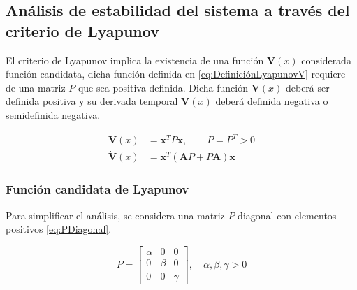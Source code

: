 
\subsection{Análisis de estabilidad del sistema a través del criterio de Lyapunov}

El criterio de Lyapunov implica la existencia de una función $\mathbf{V}(x)$ considerada
función candidata, dicha función definida en \eqref{eq:DefiniciónLyapunovV} requiere de
una matriz $P$ que sea positiva definida.
Dicha función $\mathbf{V}(x)$ deberá ser definida positiva y su derivada temporal
$\mathbf{\dot{V}}(x)$ deberá definida negativa o semidefinida negativa.

\begin{equation}
  \begin{aligned}
    \mathbf{V}(x)       &= \mathbf{x}^TP\mathbf{x},\qquad P=P^T > 0  \\
    \mathbf{\dot{V}}(x) &= \mathbf{x}^T \left(\mathbf{A} P + P \mathbf{A} \right)\mathbf{x}
    \label{eq:DefiniciónLyapunovV}
  \end{aligned}
\end{equation}

\subsubsection{Función candidata de Lyapunov}

Para simplificar el análisis, se considera una matriz $P$ diagonal con elementos
positivos \eqref{eq:PDiagonal}.

\begin{equation}
    P = \begin{bmatrix}
        \alpha & 0 & 0 \\
        0 & \beta & 0 \\
        0 & 0 & \gamma
    \end{bmatrix}, \quad \alpha, \beta, \gamma > 0
    \label{eq:PDiagonal}
\end{equation}


